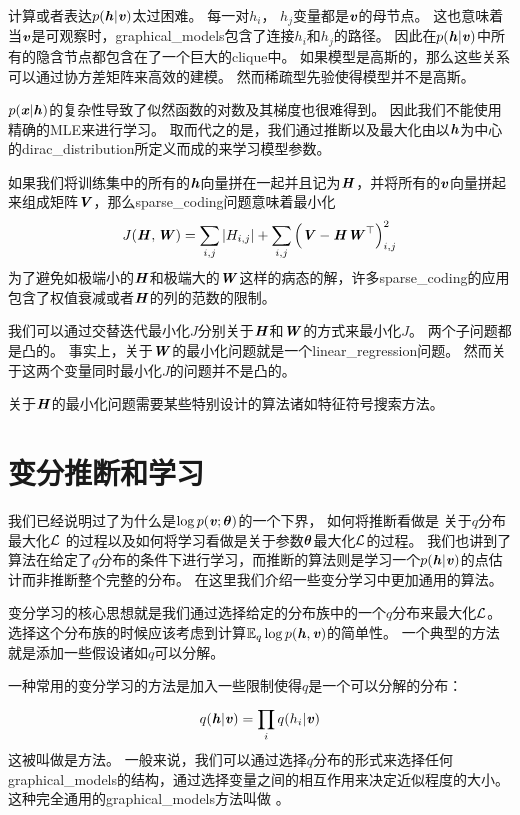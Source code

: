 计算或者表达$p(\boldsymbol{\mathit{h}}\vert\boldsymbol{\mathit{v}})$太过困难。
每一对$h_i$， $h_j$变量都是$\boldsymbol{\mathit{v}}$的母节点。
这也意味着当$\boldsymbol{\mathit{v}}$是可观察时，\gls{graphical_models}包含了连接$h_i$和$h_j$的路径。
因此在$p(\boldsymbol{\mathit{h}} \vert\boldsymbol{\mathit{v}})$中所有的隐含节点都包含在了一个巨大的\gls{clique}中。
如果模型是高斯的，那么这些关系可以通过协方差矩阵来高效的建模。
然而稀疏型先验使得模型并不是高斯。



$p(\boldsymbol{\mathit{x}}\vert\boldsymbol{\mathit{h}})$的复杂性导致了似然函数的对数及其梯度也很难得到。
因此我们不能使用精确的\gls{MLE}来进行学习。
取而代之的是，我们通过推断以及最大化由以$\boldsymbol{\mathit{h}}$为中心的\gls{dirac_distribution}所定义而成的来学习模型参数。


如果我们将训练集中的所有的$\boldsymbol{\mathit{h}}$向量拼在一起并且记为$\boldsymbol{\mathit{H}}$，并将所有的$\boldsymbol{\mathit{v}}$向量拼起来组成矩阵$\boldsymbol{\mathit{V}}$，那么\gls{sparse_coding}问题意味着最小化
\begin{align}
	J(\boldsymbol{\mathit{H}},\boldsymbol{\mathit{W}}) = \sum_{i,j}^{}\vert H_{i,j}\vert 
	+ \sum_{i,j}^{}\Big(\boldsymbol{\mathit{V}} - \boldsymbol{\mathit{H}} \boldsymbol{\mathit{W}}^{\top}\Big)^2_{i,j}
\end{align}
为了避免如极端小的$\boldsymbol{\mathit{H}}$和极端大的$\boldsymbol{\mathit{W}}$这样的病态的解，许多\gls{sparse_coding}的应用包含了权值衰减或者$\boldsymbol{\mathit{H}}$的列的范数的限制。


我们可以通过交替迭代最小化$J$分别关于$\boldsymbol{\mathit{H}}$和$\boldsymbol{\mathit{W}}$的方式来最小化$J$。
两个子问题都是凸的。
事实上，关于$\boldsymbol{\mathit{W}}$的最小化问题就是一个\gls{linear_regression}问题。
然而关于这两个变量同时最小化$J$的问题并不是凸的。


关于$\boldsymbol{\mathit{H}}$的最小化问题需要某些特别设计的算法诸如特征符号搜索方法\citep{HonglakLee-2007}。


\section{变分推断和学习}
\label{sec:variational_inference_and_learning}


我们已经说明过了为什么是$\log  p(\boldsymbol{\mathit{v}};\boldsymbol{\theta})$的一个下界， 如何将推断看做是 关于$q$分布最大化$\mathcal{L}$ 的过程以及如何将学习看做是关于参数$\boldsymbol{\theta}$最大化$\mathcal{L}$的过程。
我们也讲到了算法在给定了$q$分布的条件下进行学习，而推断的算法则是学习一个$p(\boldsymbol{\mathit{h}} \vert \boldsymbol{\mathit{v}})$的点估计而非推断整个完整的分布。
在这里我们介绍一些变分学习中更加通用的算法。


变分学习的核心思想就是我们通过选择给定的分布族中的一个$q$分布来最大化$\mathcal{L}$。
选择这个分布族的时候应该考虑到计算$\mathbb{E}_q \log p(\boldsymbol{\mathit{h}},\boldsymbol{\mathit{v}})$的简单性。
一个典型的方法就是添加一些假设诸如$q$可以分解。


一种常用的变分学习的方法是加入一些限制使得$q$是一个可以分解的分布：
\begin{align}
	q(\boldsymbol{\mathit{h}}\vert\boldsymbol{\mathit{v}}) = \prod_{i}^{}q(h_i \vert \boldsymbol{\mathit{v}})
\end{align}
这被叫做是方法。
一般来说，我们可以通过选择$q$分布的形式来选择任何\gls{graphical_models}的结构，通过选择变量之间的相互作用来决定近似程度的大小。
这种完全通用的\gls{graphical_models}方法叫做 \citep{Saul96}。


